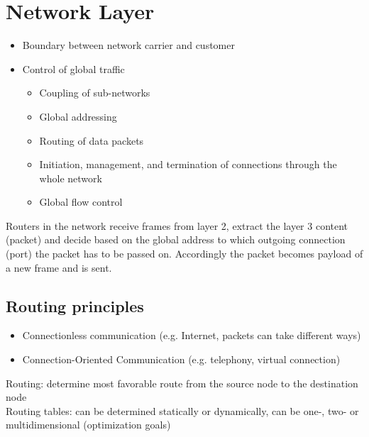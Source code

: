 \documentclass[11pt,ngerman]{article}
\begin{document}
\section{Network	Layer}
\begin{itemize}[noitemsep,nolistsep]
\item Boundary	between	network	carrier	
and	customer
\item Control	of	global	traffic
\begin{itemize}[noitemsep,nolistsep]
	\item Coupling	of	sub-networks
	\item Global	addressing
	\item Routing	of	data	packets
	\item Initiation,	management,	and	 termination	of	connections	through	 the	whole	network
	\item Global	flow	control\\
\end{itemize}

\end{itemize}
\noindent Routers	in	the	network	receive frames from	layer	2,	
extract	the	layer	3	content	(packet)	and	decide	
based	on	the	global	address to	which	outgoing	
connection	(port)	the	packet	has	to	be	passed	on.	
Accordingly	the	packet	becomes	payload of	a	new	
frame	and	is	sent.

\subsection{Routing	principles}
\begin{itemize}[noitemsep,nolistsep]
	\item Connectionless	communication	(e.g.	Internet, packets	can	take	different	ways)
	\item Connection-Oriented	Communication 	(e.g.	telephony, virtual connection)\\
\end{itemize}

\noindent Routing: determine	most	favorable	route	from	the	source	node	to	the	
destination	node\\
Routing tables: can be determined statically or dynamically, can be one-, two- or multidimensional (optimization goals)
\end{document}
